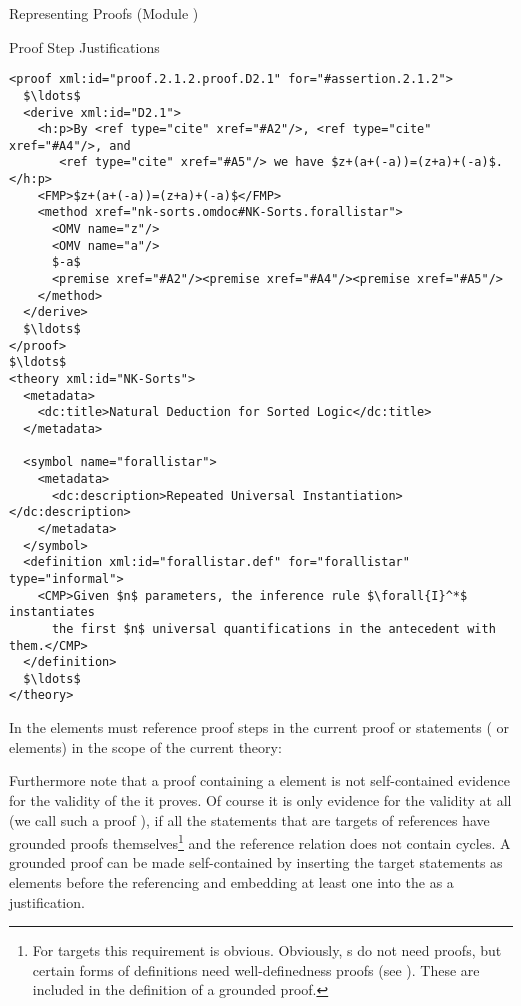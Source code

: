 \begin{omgroup}[id=proofs,short=Representing Proofs]{Representing Proofs (Module {})}
\begin{module}[id=justifications]
\begin{omgroup}[id=proofs.justifications]{Proof Step Justifications}
\begin{lstlisting}[label=lst:derive,mathescape,
  caption={A {\element{derive}} Proof Step},index={derive,method,premise}]
<proof xml:id="proof.2.1.2.proof.D2.1" for="#assertion.2.1.2">
  $\ldots$
  <derive xml:id="D2.1">
    <h:p>By <ref type="cite" xref="#A2"/>, <ref type="cite" xref="#A4"/>, and
       <ref type="cite" xref="#A5"/> we have $z+(a+(-a))=(z+a)+(-a)$.</h:p>
    <FMP>$z+(a+(-a))=(z+a)+(-a)$</FMP>
    <method xref="nk-sorts.omdoc#NK-Sorts.forallistar">
      <OMV name="z"/>
      <OMV name="a"/>
      $-a$
      <premise xref="#A2"/><premise xref="#A4"/><premise xref="#A5"/>
    </method>
  </derive>
  $\ldots$
</proof>
$\ldots$
<theory xml:id="NK-Sorts">
  <metadata>
    <dc:title>Natural Deduction for Sorted Logic</dc:title>
  </metadata>
  
  <symbol name="forallistar">
    <metadata>
      <dc:description>Repeated Universal Instantiation></dc:description>
    </metadata>
  </symbol>
  <definition xml:id="forallistar.def" for="forallistar" type="informal">
    <CMP>Given $n$ parameters, the inference rule $\forall{I}^*$ instantiates 
      the first $n$ universal quantifications in the antecedent with them.</CMP>
  </definition>
  $\ldots$
</theory>
\end{lstlisting}

\begin{omtext}
  In {\omdoc} the {} elements must reference proof steps in the current
  proof or statements ({} or {} elements) in the scope
  of the current theory: 
\end{omtext}

Furthermore note that a proof containing a {} element is not
self-contained evidence for the validity of the {} it proves.
Of course it is only evidence for the validity at all (we call such a proof
{}), if all the statements that are targets of
{} references have grounded proofs themselves\footnote{For
  {} targets this requirement is obvious. Obviously,
  {s} do not need proofs, but certain forms of definitions need
  well-definedness proofs (see {}). These are included in
  the definition of a grounded proof.} and the reference relation does not contain
cycles. A grounded proof can be made self-contained by inserting the target
statements as {} elements before the referencing
{} and embedding at least one {} into the
{} as a justification.


\end{omgroup}
\end{module}
\end{omgroup}
